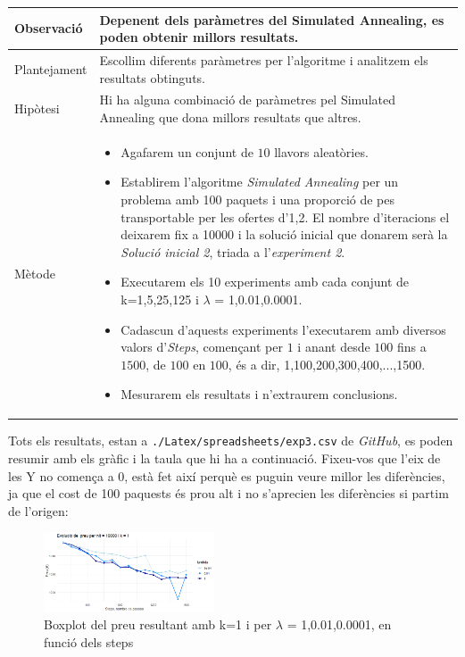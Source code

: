 \documentclass[a4paper]{article}
\begin{document}
	\begin{table}[ht]
		\centering
		\begin{tabular}{|l|p{10cm}|}
			\hline
			Observació & Depenent dels paràmetres del Simulated Annealing, es poden obtenir millors resultats. \\
			\hline
			Plantejament & Escollim diferents paràmetres per l'algoritme i analitzem els resultats obtinguts. \\
			\hline
			Hipòtesi & Hi ha alguna combinació de paràmetres pel Simulated Annealing que dona millors resultats que altres.\\
			\hline
			Mètode &
			\begin{itemize}
				\item Agafarem un conjunt de $10$ llavors aleatòries.
				\item Establirem l'algoritme \textit{Simulated Annealing} per un problema amb 100 paquets i una proporció de pes transportable per les ofertes d'1,2. El nombre d'iteracions el deixarem fix a 10000 i la solució inicial que donarem serà la \textit{Solució inicial 2}, triada a l'\textit{experiment 2}.
				\item Executarem els 10 experiments amb cada conjunt de k={1,5,25,125} i $\lambda$ = {1,0.01,0.0001}.
				\item Cadascun d'aquests experiments l'executarem amb diversos valors d'\textit{Steps}, començant per $1$ i anant desde $100$ fins a $1500$, de $100$ en $100$, és a dir, {1,100,200,300,400,...,1500}. 
				\item Mesurarem els resultats i n'extraurem conclusions.
			\end{itemize} \\
			\hline
		\end{tabular}
		\label{tab:exp3_apartats}
	\end{table}
	
	Tots els resultats, estan a \texttt{./Latex/spreadsheets/exp3.csv} de \textit{GitHub}, es poden resumir amb els gràfic i la taula que hi ha a continuació. Fixeu-vos que l'eix de les Y no comença a 0, està fet així perquè es puguin veure millor les diferències, ja que el cost de 100 paquests és prou alt i no s'aprecien les diferències si partim de l'origen:
	
	\begin{figure}[H]
		\centering
		\includegraphics[width=0.45\textwidth]{images/exp3_k1.png}
		\caption{Boxplot del preu resultant amb k=1 i per $\lambda$ = {1,0.01,0.0001}, en funció dels steps}
		\label{fig:exp3_k1}
	\end{figure}
	
\end{document}
